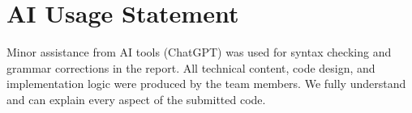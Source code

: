 \documentclass[a4paper,12pt]{article}
\begin{document}
\section*{AI Usage Statement}

Minor assistance from AI tools (ChatGPT) was used for syntax checking and grammar corrections in the report. All technical content, code design, and implementation logic were produced by the team members. We fully understand and can explain every aspect of the submitted code.
\end{document}
